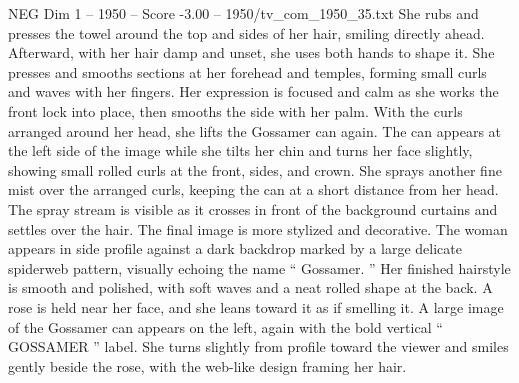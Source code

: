 \begin{textsample}{NEG Dim 1 – 1950 – Score -3.00 – 1950/tv\_com\_1950\_35.txt}
She rubs and presses the towel around the top and sides of her hair, smiling directly ahead.
Afterward, with her hair damp and unset, she uses both hands to shape it.
She presses and smooths sections at her forehead and temples, forming small curls and waves with her fingers.
Her expression is focused and calm as she works the front lock into place, then smooths the side with her palm.
With the curls arranged around her head, she lifts the Gossamer can again.
The can appears at the left side of the image while she tilts her chin and turns her face slightly, showing small rolled curls at the front, sides, and crown.
She sprays another fine mist over the arranged curls, keeping the can at a short distance from her head.
The spray stream is visible as it crosses in front of the background curtains and settles over the hair.
The final image is more stylized and decorative.
The woman appears in side profile against a dark backdrop marked by a large delicate spiderweb pattern, visually echoing the name “ Gossamer. ” Her finished hairstyle is smooth and polished, with soft waves and a neat rolled shape at the back.
A rose is held near her face, and she leans toward it as if smelling it.
A large image of the Gossamer can appears on the left, again with the bold vertical “ GOSSAMER ” label.
She turns slightly from profile toward the viewer and smiles gently beside the rose, with the web-like design framing her hair.

\end{textsample}
